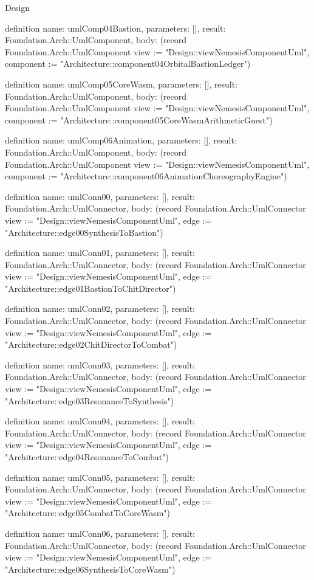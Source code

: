 \begin{lexlean}{Design}
\begin{semanticmodule}
definition{
  name: umlComp04Bastion,
  parameters: [],
  result: Foundation.Arch::UmlComponent,
  body: (record Foundation.Arch::UmlComponent {view := "Design::viewNemesisComponentUml", component := "Architecture::component04OrbitalBastionLedger"})
}

definition{
  name: umlComp05CoreWasm,
  parameters: [],
  result: Foundation.Arch::UmlComponent,
  body: (record Foundation.Arch::UmlComponent {view := "Design::viewNemesisComponentUml", component := "Architecture::component05CoreWasmArithmeticGuest"})
}

definition{
  name: umlComp06Animation,
  parameters: [],
  result: Foundation.Arch::UmlComponent,
  body: (record Foundation.Arch::UmlComponent {view := "Design::viewNemesisComponentUml", component := "Architecture::component06AnimationChoreographyEngine"})
}

definition{
  name: umlConn00,
  parameters: [],
  result: Foundation.Arch::UmlConnector,
  body: (record Foundation.Arch::UmlConnector {view := "Design::viewNemesisComponentUml", edge := "Architecture::edge00SynthesisToBastion"})
}

definition{
  name: umlConn01,
  parameters: [],
  result: Foundation.Arch::UmlConnector,
  body: (record Foundation.Arch::UmlConnector {view := "Design::viewNemesisComponentUml", edge := "Architecture::edge01BastionToChitDirector"})
}

definition{
  name: umlConn02,
  parameters: [],
  result: Foundation.Arch::UmlConnector,
  body: (record Foundation.Arch::UmlConnector {view := "Design::viewNemesisComponentUml", edge := "Architecture::edge02ChitDirectorToCombat"})
}

definition{
  name: umlConn03,
  parameters: [],
  result: Foundation.Arch::UmlConnector,
  body: (record Foundation.Arch::UmlConnector {view := "Design::viewNemesisComponentUml", edge := "Architecture::edge03ResonanceToSynthesis"})
}

definition{
  name: umlConn04,
  parameters: [],
  result: Foundation.Arch::UmlConnector,
  body: (record Foundation.Arch::UmlConnector {view := "Design::viewNemesisComponentUml", edge := "Architecture::edge04ResonanceToCombat"})
}

definition{
  name: umlConn05,
  parameters: [],
  result: Foundation.Arch::UmlConnector,
  body: (record Foundation.Arch::UmlConnector {view := "Design::viewNemesisComponentUml", edge := "Architecture::edge05CombatToCoreWasm"})
}

definition{
  name: umlConn06,
  parameters: [],
  result: Foundation.Arch::UmlConnector,
  body: (record Foundation.Arch::UmlConnector {view := "Design::viewNemesisComponentUml", edge := "Architecture::edge06SynthesisToCoreWasm"})
}


\end{semanticmodule}
\end{lexlean}
